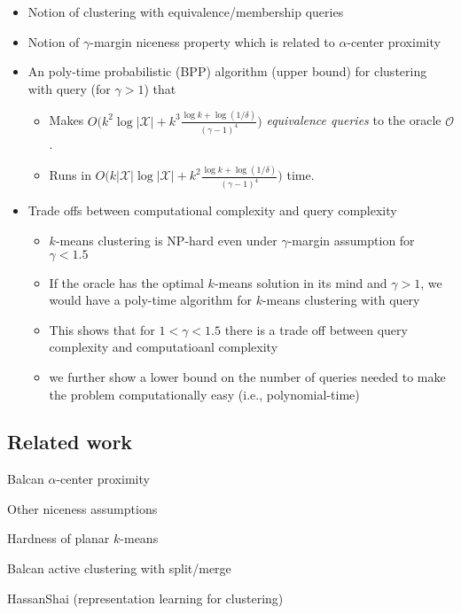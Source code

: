 \documentclass[orivec]{llncs}
\newcommand{\mc}{\mathcal}
\begin{document}
\begin{itemize}
\item Notion of clustering with equivalence/membership queries
\item Notion of $\gamma$-margin niceness property which is related to $\alpha$-center proximity
\item An poly-time probabilistic (BPP) algorithm (upper bound) for clustering with query (for $\gamma>1$) that
\begin{itemize}
\item Makes $O\big(k^2\log |\mc X| + k^3\frac{\log k + \log (1/\delta)}{(\gamma - 1)^4}\big)$ \emph{equivalence queries} to the oracle $\mc O$.
\item Runs in $O\big(k|\mc X|\log |\mc X| + k^2\frac{\log k + \log (1/\delta)}{(\gamma - 1)^4}\big)$ time.
\end{itemize}

\item Trade offs between computational complexity and query complexity
\begin{itemize}
\item $k$-means clustering is NP-hard even under $\gamma$-margin assumption for $\gamma < 1.5$
\item If the oracle has the optimal $k$-means solution in its mind and $\gamma > 1$, we would have a poly-time algorithm for $k$-means clustering with query
\item This shows that for $1<\gamma <1.5$ there is a trade off between query complexity and computatioanl complexity
\item we further show a lower bound on the number of queries needed to make the problem computationally easy (i.e., polynomial-time)


\end{itemize}

\end{itemize}


\subsection{Related work}

Balcan $\alpha$-center proximity

Other niceness assumptions

Hardness of planar $k$-means

Balcan active clustering with split/merge

HassanShai (representation learning for clustering)
\end{document}
